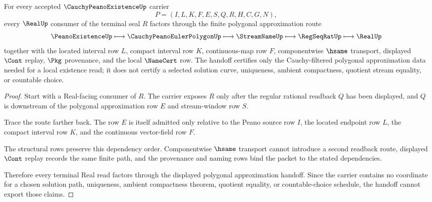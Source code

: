 \begin{theorem}
\label{thm:cauchy-peano-existence-polygonal-approximation-handoff}
For every accepted $\CauchyPeanoExistenceUp$ carrier
$$
P=(I,L,K,F,E,S,Q,R,H,C,G,N),
$$
every $\RealUp$ consumer of the terminal seal $R$ factors through the finite polygonal approximation route
$$
\PeanoExistenceUp
\longmapsto \CauchyPeanoEulerPolygonUp
\longmapsto \StreamNameUp
\longmapsto \RegSeqRatUp
\longmapsto \RealUp
$$
together with the located interval row $L$, compact interval row $K$, continuous-map row $F$, componentwise $\hsame$ transport, displayed $\Cont$ replay, $\Pkg$ provenance, and the local $\NameCert$ row. The handoff certifies only the Cauchy-filtered polygonal approximation data needed for a local existence read; it does not certify a selected solution curve, uniqueness, ambient compactness, quotient stream equality, or countable choice.
\end{theorem}
\begin{proof}
Start with a Real-facing consumer of $R$. The carrier exposes $R$ only after the regular rational readback $Q$ has been displayed, and $Q$ is downstream of the polygonal approximation row $E$ and stream-window row $S$.

Trace the route farther back. The row $E$ is itself admitted only relative to the Peano source row $I$, the located endpoint row $L$, the compact interval row $K$, and the continuous vector-field row $F$.

The structural rows preserve this dependency order. Componentwise $\hsame$ transport cannot introduce a second readback route, displayed $\Cont$ replay records the same finite path, and the provenance and naming rows bind the packet to the stated dependencies.

Therefore every terminal Real read factors through the displayed polygonal approximation handoff. Since the carrier contains no coordinate for a chosen solution path, uniqueness, ambient compactness theorem, quotient equality, or countable-choice schedule, the handoff cannot export those claims.
\end{proof}



